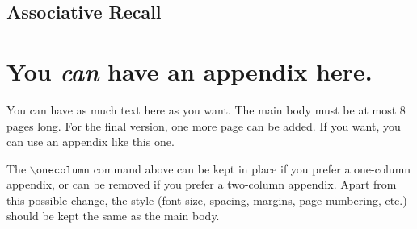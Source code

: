 \documentclass{article}
\theoremstyle{plain}
\theoremstyle{definition}
\theoremstyle{remark}
\begin{document}
\subsection{Associative Recall}
\label{sec:Associative_Recall}








\newpage
\appendix
\onecolumn
\section{You \emph{can} have an appendix here.}

You can have as much text here as you want. The main body must be at most $8$ pages long.
For the final version, one more page can be added.
If you want, you can use an appendix like this one.  

The $\mathtt{\backslash onecolumn}$ command above can be kept in place if you prefer a one-column appendix, or can be removed if you prefer a two-column appendix.  Apart from this possible change, the style (font size, spacing, margins, page numbering, etc.) should be kept the same as the main body.
\end{document}

